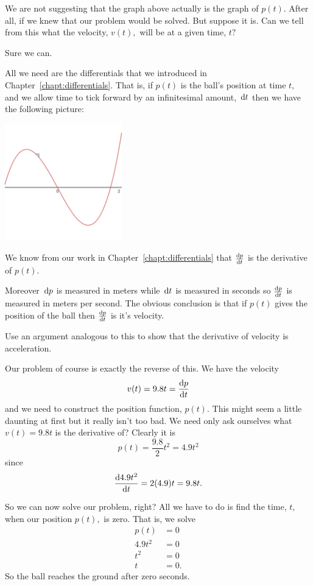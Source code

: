 We are not suggesting that the graph above actually is the graph of
$p(t).$ After all, if we knew that our problem would be solved. 
But suppose it is. Can we tell from this
what the velocity, $v(t),$ will be at a given time, $t?$

Sure we can. 

All we need are the differentials that we introduced in
Chapter~\ref{chapt:differentials}. That is, if $p(t)$ is the ball's
position at time $t,$ and we allow time to tick forward by an
infinitesimal amount, $\thinspace{\rm d}t$ then we have the following picture:

\centerline{\includegraphics*[height=2in,width=2in]{Figures/GenericVelocityWithDiffTri}}


We know from our work in Chapter~\ref{chapt:differentials} that
$\frac{\text{d}{p}}{\text{d}{t}}$ is the derivative of $p(t).$

Moreover $\thinspace{\rm d}p$ is measured in meters while $\thinspace{\rm d}t$ is measured in
seconds so $\frac{\text{d}{p}}{\text{d}{t}}$ is measured in meters per second. The obvious
conclusion is that if $p(t)$ gives the position of the ball then
$\frac{\text{d}{p}}{\text{d}{t}}$ is it's velocity.

\begin{embeddedproblem}{}
Use an argument  analogous to this to show that the derivative of
velocity is acceleration.
\end{embeddedproblem}

Our problem of course is exactly the reverse of this. We have the
velocity
$$
v(t) = 9.8 t = \frac{\text{d}{p}}{\text{d}{t}}
$$
and we need to construct the position function, $p(t).$ This might seem
a little daunting at first but it really isn't too bad. We need only
ask ourselves what $v(t) = 9.8t$ is the derivative of? Clearly it is 
$$
p(t) = \frac{9.8}{2}t^2=4.9t^2
$$ 
since 
$$
\frac{\text{d}{4.9t^2}}{\text{d}{t}}=2(4.9)t=9.8t.
$$

So we can now solve our problem, right? All we have to do is find the
time, $t,$ when our position $p(t),$ is zero. That is, we solve
\begin{align*}
  p(t)&=0\\
  4.9t^2&=0\\
  t^2&=0\\
  t&=0.
\end{align*}
So the ball reaches the ground after zero seconds.

